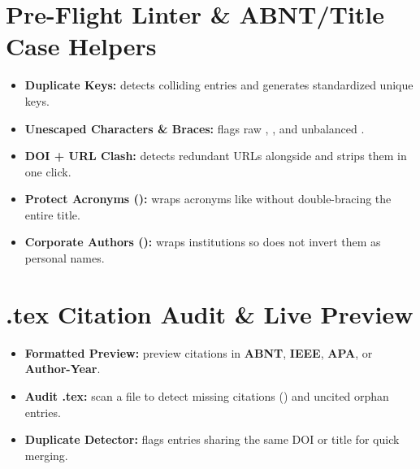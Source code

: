 \documentclass[11pt,a4paper]{article}
\begin{document}
\section{Pre-Flight Linter & ABNT/Title Case Helpers}
\begin{itemize}
  \item \textbf{Duplicate Keys:} detects colliding  entries and generates standardized unique keys.
  \item \textbf{Unescaped Characters & Braces:} flags raw \code{\&}, \code{\%}, \code{\#} and unbalanced \code{\{\}}.
  \item \textbf{DOI + URL Clash:} detects redundant  URLs alongside  and strips them in one click.
  \item \textbf{Protect Acronyms ():} wraps acronyms like  without double-bracing the entire title.
  \item \textbf{Corporate Authors ():} wraps institutions so  does not invert them as personal names.
\end{itemize}

\section{.tex Citation Audit & Live Preview}
\begin{itemize}
  \item \textbf{Formatted Preview:} preview citations in \textbf{ABNT}, \textbf{IEEE}, \textbf{APA}, or \textbf{Author-Year}.
  \item \textbf{Audit .tex:} scan a  file to detect missing citations (\code{[?]}) and uncited orphan entries.
  \item \textbf{Duplicate Detector:} flags entries sharing the same DOI or title for quick merging.
\end{itemize}
\end{document}
